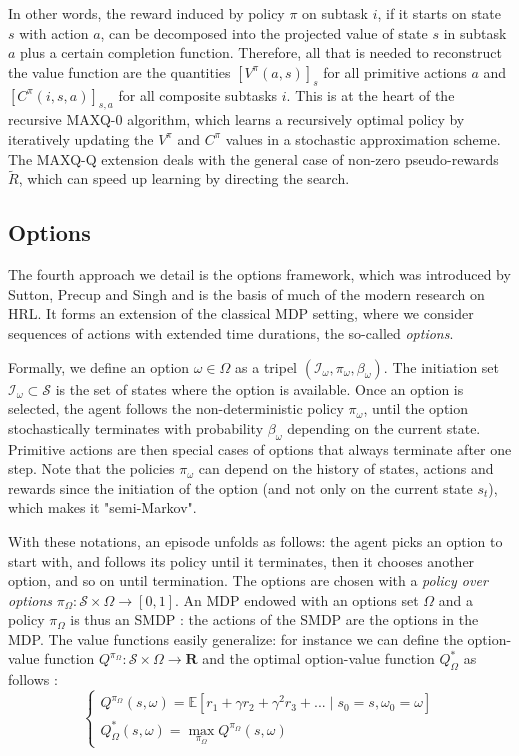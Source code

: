 \documentclass{article}
\newcommand{\Rr}{\mathbf{R}}
\newcommand{\Ee}{\mathbb{E}}
\begin{document}
In other words, the reward induced by policy $\pi$ on subtask $i$, if it starts on state $s$ with action $a$, can be decomposed into the projected value of state $s$ in subtask $a$ plus a certain completion function.
Therefore, all that is needed to reconstruct the value function are the quantities $[V^{\pi}(a, s)]_s$ for all primitive actions $a$ and $[C^{\pi}(i, s, a)]_{s, a}$ for all composite subtasks $i$. This is at the heart of the recursive MAXQ-0 algorithm, which learns a recursively optimal policy by iteratively updating the $V^{\pi}$ and $C^{\pi}$ values in a stochastic approximation scheme. The MAXQ-Q extension deals with the general case of non-zero pseudo-rewards $\tilde{R}$, which can speed up learning by directing the search.

\subsection{Options}

The fourth approach we detail is the options framework, which was introduced by Sutton, Precup and Singh \cite{sutton_between_1999} and is the basis of much of the modern research on HRL. It forms an extension of the classical MDP setting, where we consider sequences of actions with extended time durations, the so-called \textit{options}.

Formally, we define an option $\omega \in \Omega$ as a tripel $(\mathcal{I}_\omega, \pi_\omega, \beta_\omega)$. The initiation set $\mathcal{I}_\omega \subset \mathcal{S}$ is the set of states where the option is available. Once an option is selected, the agent follows the non-deterministic policy $\pi_\omega$, until the option stochastically terminates with probability $\beta_\omega$ depending on the current state. Primitive actions are then special cases of options that always terminate after one step. Note that the policies $\pi_\omega$ can  depend on the history of states, actions and rewards since the initiation of the option (and not only on the current state $s_t$), which makes it "semi-Markov".

With these notations, an episode unfolds as follows: the agent picks an option to start with, and follows its policy until it terminates, then it chooses another option, and so on until termination. The options are chosen with a \textit{policy over options} $\pi_\Omega : \mathcal{S} \times \Omega \rightarrow [0, 1]$. An MDP endowed with an options set $\Omega$ and a policy $\pi_\Omega$ is thus an SMDP : the actions of the SMDP are the options in the MDP.
The value functions easily generalize: for instance we can define the option-value function $Q^{\pi_\Omega} : \mathcal{S} \times \Omega \rightarrow \Rr$ and the optimal option-value function $Q^*_\Omega$ as follows :
\begin{equation}
\begin{cases}
Q^{\pi_\Omega}(s, \omega) = \Ee[r_1 + \gamma r_2 + \gamma^2 r_3 +  ... \mid s_0 = s, \omega_0 = \omega] \\
Q^*_\Omega(s, \omega) = \max_{\pi_\Omega} Q^{\pi_\Omega}(s, \omega)
\end{cases}
\end{equation}
\end{document}
